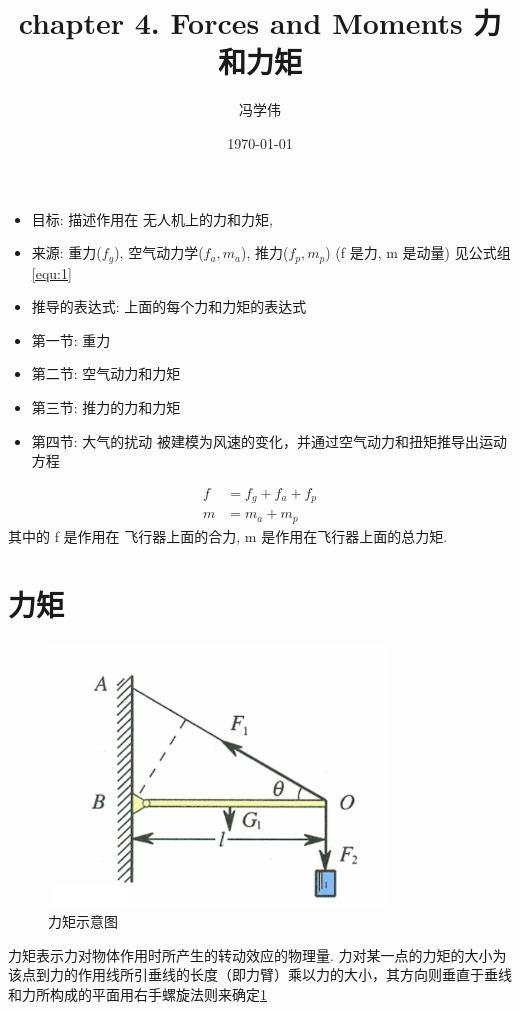 \documentclass[UTF8,a4paper,10pt,nocolorlinks]{ctexart}
\title{chapter 4. Forces and Moments 力和力矩}
\author{冯学伟}
\date{\today}
\begin{document}
    \maketitle
    \begin{itemize}
      \item 目标: 描述作用在 无人机上的力和力矩, 
      \item 来源: 重力($f_{g}$), 空气动力学($f_{a}, m_{a}$), 推力($f_{p}, m_{p}$) (f 是力, m 是动量) 见公式组\ref{equ:1}
      \item 推导的表达式: 上面的每个力和力矩的表达式
      \item 第一节: 重力
      \item 第二节: 空气动力和力矩
      \item 第三节: 推力的力和力矩
      \item 第四节: 大气的扰动 被建模为风速的变化，并通过空气动力和扭矩推导出运动方程
    \end{itemize}
    
    \begin{align}
      f &= f_{g} + f_{a} + f_{p}  \nonumber\\
      m &= m_{a} + m_{p}
      \label{equ:1}
    \end{align}
    其中的 f 是作用在 飞行器上面的合力, m 是作用在飞行器上面的总力矩.
    
    \section{力矩}
    \begin{figure}[htpb]
      \centering
      \includegraphics[width=0.8\textwidth]{picture/moment.png} %
      \caption{力矩示意图}
      \label{fig_moment}
    \end{figure}
    力矩表示力对物体作用时所产生的转动效应的物理量. 力对某一点的力矩的大小为该点到力的作用线所引垂线的长度（即力臂）乘以力的大小，其方向则垂直于垂线和力所构成的平面用右手螺旋法则来确定\ref{fig_moment}
\end{document}
